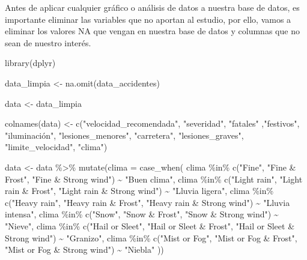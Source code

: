 \documentclass[
  letterpaper,
  DIV=11,
  numbers=noendperiod]{scrartcl}
\newenvironment{Shaded}{\begin{snugshade}}{\end{snugshade}}
\newcommand{\AttributeTok}[1]{\textcolor[rgb]{0.40,0.45,0.13}{#1}}
\newcommand{\FunctionTok}[1]{\textcolor[rgb]{0.28,0.35,0.67}{#1}}
\newcommand{\NormalTok}[1]{\textcolor[rgb]{0.00,0.23,0.31}{#1}}
\newcommand{\OtherTok}[1]{\textcolor[rgb]{0.00,0.23,0.31}{#1}}
\newcommand{\SpecialCharTok}[1]{\textcolor[rgb]{0.37,0.37,0.37}{#1}}
\newcommand{\StringTok}[1]{\textcolor[rgb]{0.13,0.47,0.30}{#1}}
\begin{document}
Antes de aplicar cualquier gráfico o análisis de datos a nuestra base de
datos, es importante eliminar las variables que no aportan al estudio,
por ello, vamos a eliminar los valores NA que vengan en nuestra base de
datos y columnas que no sean de nuestro interés.

\begin{Shaded}
\begin{Highlighting}[]
\FunctionTok{library}\NormalTok{(dplyr)}
  
\NormalTok{data\_limpia }\OtherTok{\textless{}{-}} \FunctionTok{na.omit}\NormalTok{(data\_accidentes)}

\NormalTok{data }\OtherTok{\textless{}{-}}\NormalTok{ data\_limpia}

\FunctionTok{colnames}\NormalTok{(data) }\OtherTok{\textless{}{-}} \FunctionTok{c}\NormalTok{(}\StringTok{"velocidad\_recomendada"}\NormalTok{, }\StringTok{"severidad"}\NormalTok{, }\StringTok{"fatales"}\NormalTok{ ,}\StringTok{"festivos"}\NormalTok{, }\StringTok{"iluminación"}\NormalTok{, }\StringTok{"lesiones\_menores"}\NormalTok{, }\StringTok{"carretera"}\NormalTok{, }\StringTok{"lesiones\_graves"}\NormalTok{, }\StringTok{"limite\_velocidad"}\NormalTok{, }\StringTok{"clima"}\NormalTok{)}


\NormalTok{data }\OtherTok{\textless{}{-}}\NormalTok{ data }\SpecialCharTok{\%\textgreater{}\%}
  \FunctionTok{mutate}\NormalTok{(}\AttributeTok{clima =} \FunctionTok{case\_when}\NormalTok{(}
\NormalTok{    clima }\SpecialCharTok{\%in\%} \FunctionTok{c}\NormalTok{(}\StringTok{"Fine"}\NormalTok{, }\StringTok{"Fine \& Frost"}\NormalTok{, }\StringTok{"Fine \& Strong wind"}\NormalTok{) }\SpecialCharTok{\textasciitilde{}} \StringTok{"Buen clima"}\NormalTok{,}
\NormalTok{    clima }\SpecialCharTok{\%in\%} \FunctionTok{c}\NormalTok{(}\StringTok{"Light rain"}\NormalTok{, }\StringTok{"Light rain \& Frost"}\NormalTok{, }\StringTok{"Light rain \& Strong wind"}\NormalTok{) }\SpecialCharTok{\textasciitilde{}} \StringTok{"Lluvia ligera"}\NormalTok{,}
\NormalTok{    clima }\SpecialCharTok{\%in\%} \FunctionTok{c}\NormalTok{(}\StringTok{"Heavy rain"}\NormalTok{, }\StringTok{"Heavy rain \& Frost"}\NormalTok{, }\StringTok{"Heavy rain \& Strong wind"}\NormalTok{) }\SpecialCharTok{\textasciitilde{}} \StringTok{"Lluvia intensa"}\NormalTok{,}
\NormalTok{    clima }\SpecialCharTok{\%in\%} \FunctionTok{c}\NormalTok{(}\StringTok{"Snow"}\NormalTok{, }\StringTok{"Snow \& Frost"}\NormalTok{, }\StringTok{"Snow \& Strong wind"}\NormalTok{) }\SpecialCharTok{\textasciitilde{}} \StringTok{"Nieve"}\NormalTok{,}
\NormalTok{    clima }\SpecialCharTok{\%in\%} \FunctionTok{c}\NormalTok{(}\StringTok{"Hail or Sleet"}\NormalTok{, }\StringTok{"Hail or Sleet \& Frost"}\NormalTok{, }\StringTok{"Hail or Sleet \& Strong wind"}\NormalTok{) }\SpecialCharTok{\textasciitilde{}} \StringTok{"Granizo"}\NormalTok{,}
\NormalTok{    clima }\SpecialCharTok{\%in\%} \FunctionTok{c}\NormalTok{(}\StringTok{"Mist or Fog"}\NormalTok{, }\StringTok{"Mist or Fog \& Frost"}\NormalTok{, }\StringTok{"Mist or Fog \& Strong wind"}\NormalTok{) }\SpecialCharTok{\textasciitilde{}} \StringTok{"Niebla"}
\NormalTok{  ))}



\end{Highlighting}
\end{Shaded}
\end{document}
